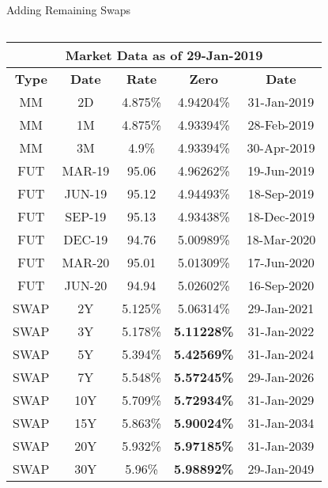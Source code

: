 \documentclass[handout, aspectratio=169]{beamer}
\begin{document}
\begin{frame}{Adding Remaining Swaps}
	\begin{columns}[T]
		\begin{column}{0.4\textwidth}
			\begin{table}[t]
				\centering
				\begin{adjustbox}{max width=\textwidth, max height=0.3\textheight}
					\begin{tabular}{|c|c|c|c|c|} 
						\hline
						\multicolumn{5}{|c|}{\textbf{Market Data as of 29-Jan-2019}} \\
						\hline
						\textbf{Type} & \textbf{Date}  & \textbf{Rate} & \textbf{Zero} & \textbf{Date}\\				
						\hline
						MM & 2D & 4.875\% & 4.94204\% &31-Jan-2019\\
						MM & 1M & 4.875\% & 4.93394\% &28-Feb-2019\\
						MM & 3M & 4.9\% & 4.93394\% &30-Apr-2019\\
						\hline
						FUT & MAR-19 & 95.06 & 4.96262\% &19-Jun-2019\\
						FUT & JUN-19 & 95.12 & 4.94493\% &18-Sep-2019\\
						FUT & SEP-19 & 95.13 & 4.93438\% &18-Dec-2019\\
						FUT & DEC-19 & 94.76 & 5.00989\% &18-Mar-2020\\
						FUT & MAR-20 & 95.01 & 5.01309\% &17-Jun-2020\\
						FUT & JUN-20 & 94.94 & 5.02602\% &16-Sep-2020\\
						\hline
						SWAP & 2Y & 5.125\% & 5.06314\% &29-Jan-2021\\
						SWAP & 3Y & 5.178\% & \textbf{5.11228\%} &31-Jan-2022\\
						SWAP & 5Y & 5.394\% & \textbf{5.42569\%} &31-Jan-2024\\
						SWAP & 7Y & 5.548\% & \textbf{5.57245\%} &29-Jan-2026\\
						SWAP & 10Y & 5.709\% & \textbf{5.72934\%} &31-Jan-2029\\
						SWAP & 15Y & 5.863\% & \textbf{5.90024\%} &31-Jan-2034\\
						SWAP & 20Y & 5.932\% & \textbf{5.97185\%} &31-Jan-2039\\
						SWAP & 30Y & 5.96\% & \textbf{5.98892\%} &29-Jan-2049\\
						\hline
					\end{tabular}
				\end{adjustbox}
			\end{table}
		\end{column}
		

\end{columns}
\end{frame}
\end{document}
